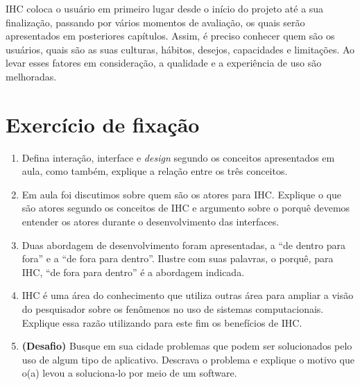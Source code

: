 IHC coloca o usuário em primeiro lugar desde o início do projeto até a sua finalização, passando por vários momentos de avaliação, os quais serão apresentados em posteriores capítulos. Assim, é preciso conhecer quem são os usuários, quais são as suas culturas, hábitos, desejos, capacidades e limitações. Ao levar esses fatores em consideração, a qualidade e a experiência de uso são melhoradas. 

\section{Exercício de fixação}

\begin{enumerate}
	\item Defina interação, interface e \textit{design} segundo os conceitos apresentados em aula, como também, explique a relação entre os três conceitos.
	\item Em aula foi discutimos sobre quem são os atores para IHC. Explique o que são atores segundo os conceitos de IHC e argumento sobre o porquê devemos entender os atores durante o desenvolvimento das interfaces.
	\item Duas abordagem de desenvolvimento foram apresentadas, a ``de dentro para fora'' e a ``de fora para dentro''. Ilustre com suas palavras, o porquê, para IHC, ``de fora para dentro'' é a abordagem indicada.
	\item IHC é uma área do conhecimento que utiliza outras área para ampliar a visão do pesquisador sobre os fenômenos no uso de sistemas computacionais. Explique essa razão utilizando para este fim os benefícios de IHC.
	\item \textbf{(Desafio)} Busque em sua cidade problemas que podem ser solucionados pelo uso de algum tipo de aplicativo. Descrava o problema e explique o motivo que o(a) levou a soluciona-lo por meio de um software. 
\end{enumerate}


